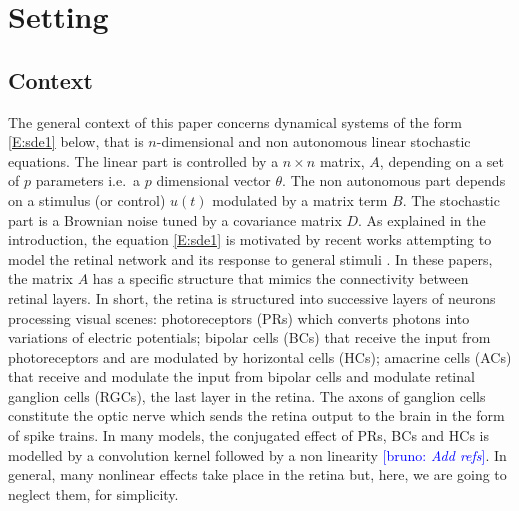 \documentclass[a4paper]{article}
\newcommand{\B}[1]{{\textcolor{blue}{[bruno: \textit{#1}]}}}
\theoremstyle{definition}
\theoremstyle{remark}
\begin{document}
\section{Setting}

\subsection{Context}\label{S:Context}
 
The general context of this paper concerns dynamical systems of the form \eqref{E:sde1} below, that is $n$-dimensional and non autonomous linear stochastic equations. The linear part is controlled by a $n \times n$ matrix, $A$, depending on a set of $p$ parameters i.e.\ a $p$ dimensional vector $\theta$.
The non autonomous part depends on a stimulus (or control) $u(t)$ modulated by a matrix term $B$. The stochastic part is a Brownian noise tuned by a covariance matrix $D$. As explained in the introduction, the equation   \eqref{E:sde1} is motivated by recent works attempting to model the retinal network and its response to general stimuli \cite{souihel-cessac:21,cessac:22,kartsaki-hilgen-etal:24,ebert-buffet-etal:24,emonet-souihel-etal:25}. In these papers, the matrix $A$ has a specific structure that mimics the connectivity between retinal layers. In short, the retina is structured into successive layers of neurons processing visual scenes: photoreceptors (PRs) which converts photons into variations of electric potentials; bipolar cells (BCs) that receive the input from photoreceptors and are modulated by horizontal cells (HCs); amacrine cells (ACs) that receive and modulate the input from bipolar cells and modulate retinal ganglion cells (RGCs), the last layer in the retina. The axons of ganglion cells constitute the optic nerve which sends the retina output to the brain in the form of spike trains. In many models, the conjugated effect of PRs, BCs and HCs is modelled by a convolution kernel followed by a non linearity \B{Add refs}. In general, many nonlinear effects take place in the retina but, here, we are going to neglect them, for simplicity.
\end{document}

